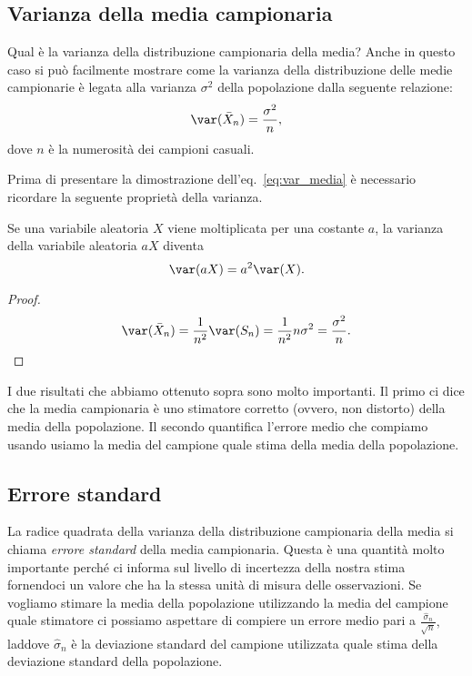 \subsection{Varianza della media campionaria}

Qual è la varianza della distribuzione campionaria della media?
Anche in questo caso si può facilmente mostrare come la varianza della distribuzione delle medie campionarie è legata alla varianza $\sigma^2$ della popolazione dalla seguente relazione:
\begin{equation}
\var(\bar{X}_n) =  \frac{\sigma^2}{n},
\label{eq:var_media}
\end{equation}
dove $n$ è la numerosità dei campioni casuali. 

Prima di presentare la dimostrazione dell'eq.~\eqref{eq:var_media} è necessario ricordare la seguente proprietà della varianza. 
\begin{teorema}
Se una variabile aleatoria $X$ viene moltiplicata per una costante $a$, la varianza della variabile aleatoria $aX$ diventa 
\begin{equation}
\var(a X) = a^2 \var(X). 
\end{equation}
\end{teorema}

\begin{proof}
\begin{equation}
\var(\bar{X}_n) = \frac{1}{n^2} \var(S_n) = \frac{1}{n^2} n \sigma^2 
= \frac{\sigma^2}{n}.
\end{equation}
\end{proof}

I due risultati che abbiamo ottenuto sopra sono molto importanti.
Il primo ci dice che la media campionaria è uno stimatore corretto (ovvero, non distorto) della media della popolazione.
Il secondo quantifica l'errore medio che compiamo usando usiamo la media del campione quale stima della media della popolazione.


\subsection{Errore standard}

La radice quadrata della varianza della distribuzione campionaria della media si chiama \emph{errore standard} della media campionaria.
Questa è una quantità molto importante perché ci informa sul livello di incertezza della nostra stima fornendoci un valore che ha la stessa unità di misura delle osservazioni.
Se vogliamo stimare la media della popolazione utilizzando la media del campione quale stimatore ci possiamo aspettare di compiere un errore medio pari a 
$
\frac{\hat{\sigma}_n}{\sqrt{n}},
$
laddove $\hat{\sigma}_n$ è la deviazione standard del campione utilizzata quale stima della deviazione standard della popolazione.


